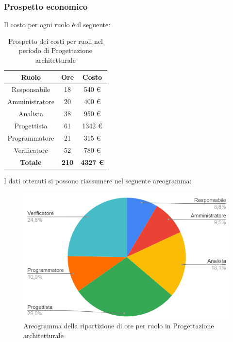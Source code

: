 \subsubsection{Prospetto economico}
Il costo per ogni ruolo è il seguente:
\begin{table}[H]
		\begin{center}
			\setlength{\aboverulesep}{0pt}
			\setlength{\belowrulesep}{0pt}
			\setlength{\extrarowheight}{.75ex}
			\begin{tabular}{ c c c }
				\rowcolor{AzzurroGruppo!30} 
				\textbf{Ruolo} & \textbf{Ore} & \textbf{Costo} \\
				\toprule
				Responsabile   & 18 & 540 \euro \\
				Amministratore & 20 & 400 \euro \\
				Analista       & 38 & 950 \euro \\
				Progettista    & 61 & 1342 \euro \\
				Programmatore  & 21 & 315 \euro \\
				Verificatore   & 52 & 780 \euro \\
				\textbf{Totale} & \textbf{210} & \textbf{4327 \euro} \\
				\bottomrule
			\end{tabular}
			\caption{ Prospetto dei costi per ruoli nel periodo di Progettazione architetturale}
		\end{center}
	\end{table}
I dati ottenuti si possono riassumere nel seguente areogramma:
\begin{figure}[H]
    \centering
    \includegraphics[scale = 0.5]{components/img/architettura_torta.png}
    \caption{ Areogramma della ripartizione di ore per ruolo in Progettazione architetturale}
    \label{fig:Areogramma ripartizione ore , fase di Progettazione architetturale}
\end{figure}
